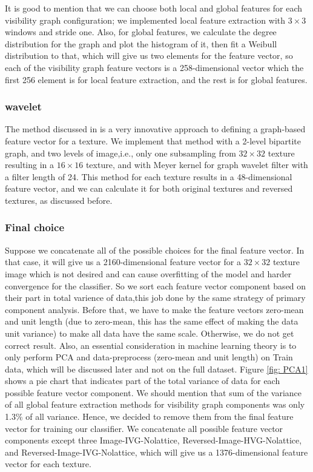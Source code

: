 \documentclass[conference]{IEEEtran}
\begin{document}
It is good to mention that we can choose both local and global features for each visibility graph configuration; we implemented local feature extraction with $3\times3$ windows and stride one. Also, for global features, we calculate the degree distribution for the graph and plot the histogram of it, then fit a Weibull distribution to that, which will give us two elements for the feature vector, so each of the visibility graph feature vectors is a 258-dimensional vector which the first 256 element is for local feature extraction, and the rest is for global features.

\subsubsection{\textbf{wavelet}}
The method discussed in \cite{wavelet} is a very innovative approach to defining a graph-based feature vector for a texture. We implement that method with a 2-level bipartite graph, and two levels of image,i.e., only one subsampling from $32\times32$ texture resulting in a $16\times16$ texture, and with Meyer kernel for graph wavelet filter with a filter length of 24.
This method for each texture results in a 48-dimensional feature vector, and we can calculate it for both original textures and reversed textures, as discussed before. 


\subsubsection*{\textbf{Final choice}}
Suppose we concatenate all of the possible choices for the final feature vector. In that case, it will give us a 2160-dimensional feature vector for a $32\times32$ texture image which is not desired and can cause overfitting of the model and harder convergence for the classifier. So we sort each feature vector component based on their part in total varience of data,this job done by the same strategy of primary component analysis. Before that, we have to make the feature vectors zero-mean and unit length (due to zero-mean, this has the same effect of making the data unit variance) to make all data have the same scale. Otherwise, we do not get correct result. Also, an essential consideration in machine learning theory is to only perform PCA and data-preprocess (zero-mean and unit length) on Train data, which will be discussed later and not on the full dataset.
Figure \ref{fig: PCA1} shows a pie chart that indicates part of the total variance of data for each possible feature vector component. We should mention that sum of the variance of all global feature extraction methods for visibility graph components was only 1.3\% of all variance. Hence, we decided to remove them from the final feature vector for training our classifier. We concatenate all possible feature vector components except three\: Image-IVG-Nolattice, Reversed-Image-HVG-Nolattice, and Reversed-Image-IVG-Nolattice, which will give us a 1376-dimensional feature vector for each texture.
\end{document}
